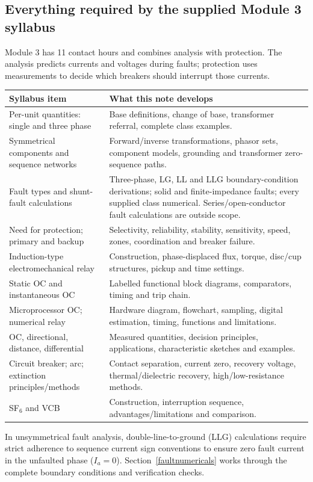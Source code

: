 \documentclass[11pt,a4paper]{article}
\newenvironment{Caution}[1]{\begin{tcolorbox}[colback=warm,colframe=rust,coltitle=white,title={#1}]}{\end{tcolorbox}}
\begin{document}
\subsection{Everything required by the supplied Module 3 syllabus}
Module 3 has 11 contact hours and combines analysis with protection. The analysis predicts currents and voltages during faults; protection uses measurements to decide which breakers should interrupt those currents.
\begin{center}\small
\begin{tabularx}{\textwidth}{L{.38\textwidth}Y}
\toprule Syllabus item & What this note develops\\\midrule
Per-unit quantities: single and three phase & Base definitions, change of base, transformer referral, complete class examples.\\
Symmetrical components and sequence networks & Forward/inverse transformations, phasor sets, component models, grounding and transformer zero-sequence paths.\\
Fault types and shunt-fault calculations & Three-phase, LG, LL and LLG boundary-condition derivations; solid and finite-impedance faults; every supplied class numerical. Series/open-conductor fault calculations are outside scope.\\
Need for protection; primary and backup & Selectivity, reliability, stability, sensitivity, speed, zones, coordination and breaker failure.\\
Induction-type electromechanical relay & Construction, phase-displaced flux, torque, disc/cup structures, pickup and time settings.\\
Static OC and instantaneous OC & Labelled functional block diagrams, comparators, timing and trip chain.\\
Microprocessor OC; numerical relay & Hardware diagram, flowchart, sampling, digital estimation, timing, functions and limitations.\\
OC, directional, distance, differential & Measured quantities, decision principles, applications, characteristic sketches and examples.\\
Circuit breaker; arc; extinction principles/methods & Contact separation, current zero, recovery voltage, thermal/dielectric recovery, high/low-resistance methods.\\
SF$_6$ and VCB & Construction, interruption sequence, advantages/limitations and comparison.\\\bottomrule
\end{tabularx}\end{center}
\begin{Caution}{Key analytical pitfalls to avoid}
In unsymmetrical fault analysis, double-line-to-ground (LLG) calculations require strict adherence to sequence current sign conventions to ensure zero fault current in the unfaulted phase ($I_a=0$). Section~\ref{faultnumericals} works through the complete boundary conditions and verification checks.
\end{Caution}
\end{document}
